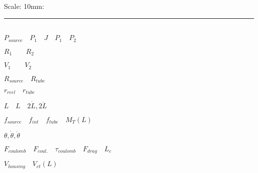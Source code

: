\documentclass[letterpaper]{article}
\begin{document}
\doublespacing
Scale:  10mm:   \rule{10mm}{1mm}\\
\vspace{.25in}
$P_{source} \quad P_1  \quad  J   \quad P_1  \quad P_2 $

$R_1 \qquad R_2$

$V_1 \qquad V_2$

$R_{source} \quad R_{tube} $

$r_{reel} \quad r_{tube} $

$L \quad L \quad 2\dot{L}, 2\ddot{L}$

$f_{source} \quad f_{int} \quad f_{tube} \quad M_T(L) \quad $

$\theta, \dot{\theta}, \ddot{\theta} $


$F_{coulomb} \quad F_{coul.} \quad \tau_{coulomb} \quad F_{drag} \quad L_c  $

$V_{housing}\quad V_{et}(L) $
\end{document}
